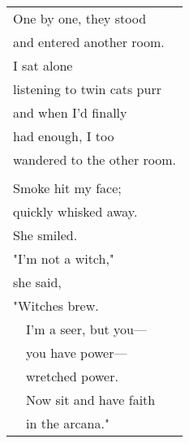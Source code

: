 \documentclass{article}
\begin{document}
\begin{center}
\begin{tabular}{l}
One by one, they stood \\
and entered another room. \\
I sat alone \\
listening to twin cats purr \\
and when I'd finally \\
had enough, I too \\
wandered to the other room. \\
\\
Smoke hit my face; \\
quickly whisked away. \\
\hspace*{4ex}She smiled. \\
"I'm not a witch," \\
\hspace*{4ex}she said, \\
"Witches brew. \\
\ \ I'm a seer, but you--- \\
\ \ you have power--- \\
\ \ wretched power. \\
\ \ Now sit and have faith \\
\ \ in the arcana." \\
%
%
%
%
%
%
%
%
\end{tabular}
\end{center}
\end{document}

